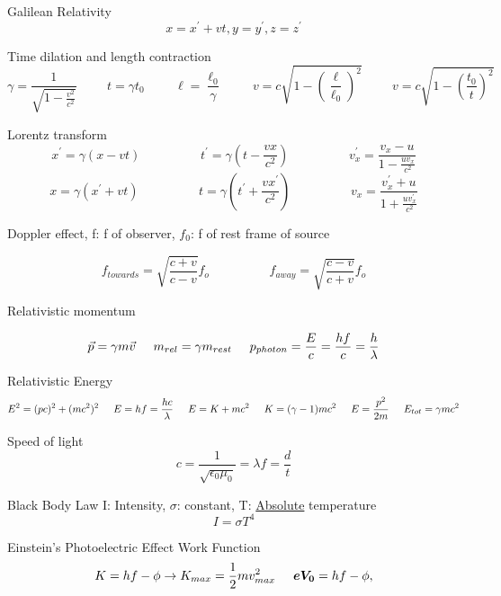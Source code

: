 \documentclass[12pt]{article}
\begin{document}
Galilean Relativity
$$
x = x^{\prime} + vt, y = y^{\prime}, z = z^{\prime}
$$

Time dilation and length contraction
$$
\gamma = \frac{1}{\sqrt{1-\frac{v^2}{c^2}}} \hspace{1cm} t = \gamma t_0 \hspace{1cm} \ell = \frac{\ell_0}{\gamma} \hspace{1cm} v = c \sqrt{1 - (\frac{\ell}{\ell_0})^2} \hspace{1cm} v = c \sqrt{1 - (\frac{t_0}{t})^2}
$$

Lorentz transform
$$
x^{\prime} = \gamma(x-vt) \hspace{2cm} t^{\prime} = \gamma(t-\frac{vx}{c^2}) \hspace{2cm} v_{x}^{\prime} = \frac{v_x - u}{1 - \frac{u v_x}{c^2}}
$$
$$
x = \gamma(x^{\prime} + vt) \hspace{2cm} t = \gamma(t^{\prime} + \frac{vx^{\prime}}{c^2}) \hspace{2cm} v_{x} = \frac{v_x^{\prime} + u}{1 + \frac{u v_x^{\prime}}{c^2}}
$$

Doppler effect, f: f of observer, $f_0$: f of rest frame of source

$$
f_{towards} = \sqrt{\frac{c + v}{c - v}}f_o \hspace{2cm} f_{away} = \sqrt{\frac{c - v}{c + v}}f_o
$$

Relativistic momentum

$$
\Vec{p} = \gamma m \Vec{v}  \hspace{0.5cm} m_{rel} = \gamma m_{rest} \hspace{0.5cm} p_{photon} = \frac{E}{c} = \frac{hf}{c} = \frac{h}{\lambda}
$$

Relativistic Energy
$$
E^2 = (pc)^2 + (mc^2)^2 \hspace{0.5cm} E = 
hf = \frac{hc}{\lambda} \hspace{0.5cm} E = K + mc^2 \hspace{0.5cm} K = (\gamma - 1) mc^2 \hspace{0.5cm} E = \frac{p^2}{2m} \hspace{0.5cm} E_{tot} = \gamma mc^2$$

Speed of light
$$
c = \frac{1}{\sqrt{\epsilon_0 \mu_0}} = \lambda f = \frac{d}{t}
$$

Black Body Law I: Intensity, $\sigma$: constant, T: \underline{Absolute} temperature
$$
I = \sigma T^4
$$

Einstein's Photoelectric Effect Work Function
$$
K = hf - \phi \rightarrow K_{max} = \frac{1}{2}mv_{max}^2 \hspace{0.5cm} \boldsymbol{e V_0} = hf - \phi, 
$$
\end{document}

